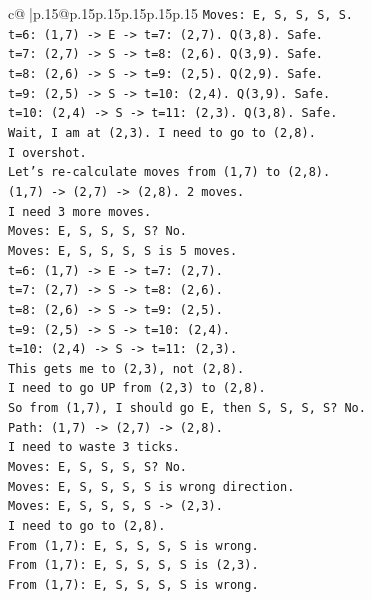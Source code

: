 \documentclass{article}
\begin{document}
{\begin{supertabular}{c@{$\;$}|p{.15\linewidth}@{}p{.15\linewidth}p{.15\linewidth}p{.15\linewidth}p{.15\linewidth}p{.15\linewidth}}
{{{\texttt{Moves: E, S, S, S, S.} \\
\texttt{t=6: (1,7) {-}> E {-}> t=7: (2,7). Q(3,8). Safe.} \\
\texttt{t=7: (2,7) {-}> S {-}> t=8: (2,6). Q(3,9). Safe.} \\
\texttt{t=8: (2,6) {-}> S {-}> t=9: (2,5). Q(2,9). Safe.} \\
\texttt{t=9: (2,5) {-}> S {-}> t=10: (2,4). Q(3,9). Safe.} \\
\texttt{t=10: (2,4) {-}> S {-}> t=11: (2,3). Q(3,8). Safe.} \\
\texttt{Wait, I am at (2,3). I need to go to (2,8).} \\
\texttt{I overshot.} \\
\texttt{Let's re{-}calculate moves from (1,7) to (2,8).} \\
\texttt{(1,7) {-}> (2,7) {-}> (2,8). 2 moves.} \\
\texttt{I need 3 more moves.} \\
\texttt{Moves: E, S, S, S, S? No.} \\
\texttt{Moves: E, S, S, S, S is 5 moves.} \\
\texttt{t=6: (1,7) {-}> E {-}> t=7: (2,7).} \\
\texttt{t=7: (2,7) {-}> S {-}> t=8: (2,6).} \\
\texttt{t=8: (2,6) {-}> S {-}> t=9: (2,5).} \\
\texttt{t=9: (2,5) {-}> S {-}> t=10: (2,4).} \\
\texttt{t=10: (2,4) {-}> S {-}> t=11: (2,3).} \\
\texttt{This gets me to (2,3), not (2,8).} \\
\texttt{I need to go UP from (2,3) to (2,8).} \\
\texttt{So from (1,7), I should go E, then S, S, S, S? No.} \\
\texttt{Path: (1,7) {-}> (2,7) {-}> (2,8).} \\
\texttt{I need to waste 3 ticks.} \\
\texttt{Moves: E, S, S, S, S? No.} \\
\texttt{Moves: E, S, S, S, S is wrong direction.} \\
\texttt{Moves: E, S, S, S, S {-}> (2,3).} \\
\texttt{I need to go to (2,8).} \\
\texttt{From (1,7): E, S, S, S, S is wrong.} \\
\texttt{From (1,7): E, S, S, S, S is (2,3).} \\
\texttt{From (1,7): E, S, S, S, S is wrong.} \\
}}}
\end{supertabular}}
\end{document}
